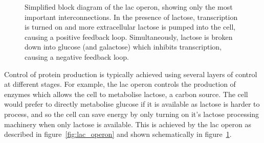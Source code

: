 \begin{figure}
  \centering
  \caption{Simplified block diagram of the lac operon, showing only the most
    important interconnections. 
    In the presence of lactose, transcription is turned on and more
    extracellular lactose is pumped into the cell, causing a positive feedback
    loop.
    Simultaneously, lactose is broken down into glucose (and galactose) which
    inhibits transcription, causing a negative feedback loop.
  }
  \label{fig:lac_block}
\end{figure}

Control of protein production is typically achieved using several layers of
control at different stages.
For example, the lac operon controls the production of enzymes which allows the
cell to metabolise lactose, a carbon source.
The cell would prefer to directly metabolise glucose if it is available as
lactose is harder to process, and so the cell can save energy by only turning
on it's lactose processing machinery when only lactose is available.
This is achieved by the lac operon as described in figure~\ref{fig:lac_operon} 
and shown schematically in figure~\ref{fig:lac_block}.

